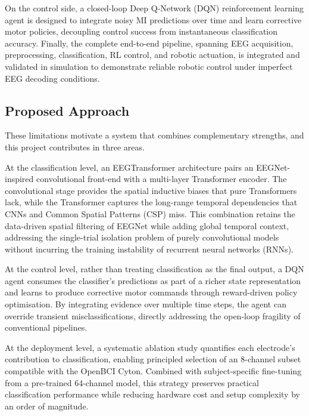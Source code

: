 \documentclass[12pt, a4paper]{article}
\begin{document}
On the control side, a closed-loop Deep Q-Network (DQN) reinforcement learning agent is designed to integrate noisy MI predictions over time and learn corrective motor policies, decoupling control success from instantaneous classification accuracy. Finally, the complete end-to-end pipeline, spanning EEG acquisition, preprocessing, classification, RL control, and robotic actuation, is integrated and validated in simulation to demonstrate reliable robotic control under imperfect EEG decoding conditions.

\subsection{Proposed Approach}

These limitations motivate a system that combines complementary strengths, and this project contributes in three areas.

At the classification level, an EEGTransformer architecture pairs an EEGNet-inspired convolutional front-end with a multi-layer Transformer encoder. The convolutional stage provides the spatial inductive biases that pure Transformers lack, while the Transformer captures the long-range temporal dependencies that CNNs and Common Spatial Patterns (CSP) miss. This combination retains the data-driven spatial filtering of EEGNet while adding global temporal context, addressing the single-trial isolation problem of purely convolutional models without incurring the training instability of recurrent neural networks (RNNs).

At the control level, rather than treating classification as the final output, a DQN agent consumes the classifier's predictions as part of a richer state representation and learns to produce corrective motor commands through reward-driven policy optimisation. By integrating evidence over multiple time steps, the agent can override transient misclassifications, directly addressing the open-loop fragility of conventional pipelines.

At the deployment level, a systematic ablation study quantifies each electrode's contribution to classification, enabling principled selection of an 8-channel subset compatible with the OpenBCI Cyton. Combined with subject-specific fine-tuning from a pre-trained 64-channel model, this strategy preserves practical classification performance while reducing hardware cost and setup complexity by an order of magnitude.
\end{document}
